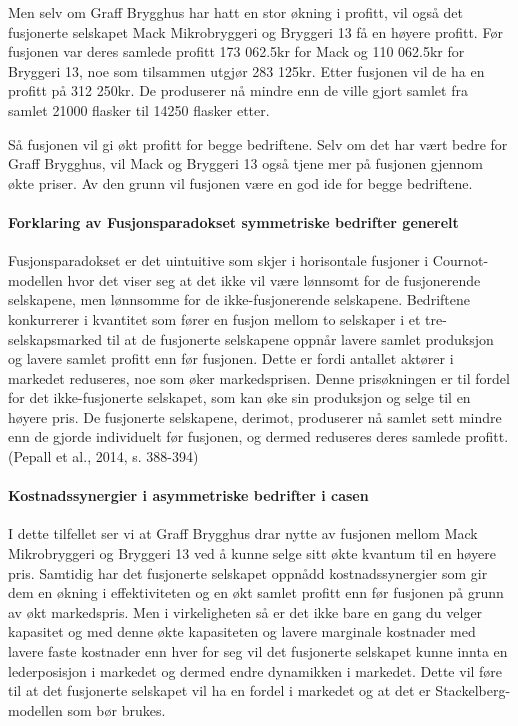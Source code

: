 \documentclass[
  12pt,
  a4paper,
  DIV=11,
  numbers=noendperiod]{scrartcl}
\let\oldparagraph\paragraph
\renewcommand{\paragraph}[1]{\oldparagraph{#1}\mbox{}}
\begin{document}
Men selv om Graff Brygghus har hatt en stor økning i profitt, vil også
det fusjonerte selskapet Mack Mikrobryggeri og Bryggeri 13 få en høyere
profitt. Før fusjonen var deres samlede profitt 173 062.5kr for Mack og
110 062.5kr for Bryggeri 13, noe som tilsammen utgjør 283 125kr. Etter
fusjonen vil de ha en profitt på 312 250kr. De produserer nå mindre enn
de ville gjort samlet fra samlet 21000 flasker til 14250 flasker etter.

Så fusjonen vil gi økt profitt for begge bedriftene. Selv om det har
vært bedre for Graff Brygghus, vil Mack og Bryggeri 13 også tjene mer på
fusjonen gjennom økte priser. Av den grunn vil fusjonen være en god ide
for begge bedriftene.

\paragraph{Forklaring av Fusjonsparadokset symmetriske bedrifter
generelt}\label{forklaring-av-fusjonsparadokset-symmetriske-bedrifter-generelt}

Fusjonsparadokset er det uintuitive som skjer i horisontale fusjoner i
Cournot-modellen hvor det viser seg at det ikke vil være lønnsomt for de
fusjonerende selskapene, men lønnsomme for de ikke-fusjonerende
selskapene. Bedriftene konkurrerer i kvantitet som fører en fusjon
mellom to selskaper i et tre-selskapsmarked til at de fusjonerte
selskapene oppnår lavere samlet produksjon og lavere samlet profitt enn
før fusjonen. Dette er fordi antallet aktører i markedet reduseres, noe
som øker markedsprisen. Denne prisøkningen er til fordel for det
ikke-fusjonerte selskapet, som kan øke sin produksjon og selge til en
høyere pris. De fusjonerte selskapene, derimot, produserer nå samlet
sett mindre enn de gjorde individuelt før fusjonen, og dermed reduseres
deres samlede profitt.(Pepall et al., 2014, s. 388-394)

\newpage

\paragraph{Kostnadssynergier i asymmetriske bedrifter i
casen}\label{kostnadssynergier-i-asymmetriske-bedrifter-i-casen}

I dette tilfellet ser vi at Graff Brygghus drar nytte av fusjonen mellom
Mack Mikrobryggeri og Bryggeri 13 ved å kunne selge sitt økte kvantum
til en høyere pris. Samtidig har det fusjonerte selskapet oppnådd
kostnadssynergier som gir dem en økning i effektiviteten og en økt
samlet profitt enn før fusjonen på grunn av økt markedspris. Men i
virkeligheten så er det ikke bare en gang du velger kapasitet og med
denne økte kapasiteten og lavere marginale kostnader med lavere faste
kostnader enn hver for seg vil det fusjonerte selskapet kunne innta en
lederposisjon i markedet og dermed endre dynamikken i markedet. Dette
vil føre til at det fusjonerte selskapet vil ha en fordel i markedet og
at det er Stackelberg-modellen som bør brukes.
\end{document}
